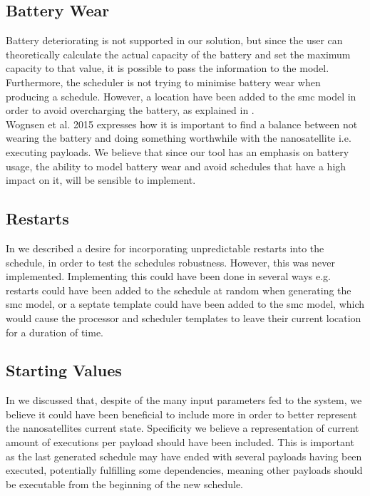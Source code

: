 \subsection*{Battery Wear}
Battery deteriorating is not supported in our solution, but since the user can theoretically calculate the actual capacity of the battery and set the maximum capacity to that value, it is possible to pass the information to the model. Furthermore, the scheduler is not trying to minimise battery wear when producing a schedule. However, a location have been added to the \gls{smc} model in order to avoid overcharging the battery, as explained in .\\
Wognsen et al. 2015\cite{score_function} expresses how it is important to find a balance between not wearing the battery and doing something worthwhile with the nanosatellite i.e. executing payloads. We believe that since our tool has an emphasis on battery usage, the ability to model battery wear and avoid schedules that have a high impact on it, will be sensible to implement. 

\subsection*{Restarts}
In  we described a desire for incorporating unpredictable restarts into the schedule, in order to test the schedules robustness. However, this was never implemented. Implementing this could have been done in several ways e.g. restarts could have been added to the schedule at random when generating the \gls{smc} model, or a septate template could have been added to the \gls{smc} model, which would cause the processor and scheduler templates to leave their current location for a duration of time.

\subsection*{Starting Values} \label{ssec:start_val}
In  we discussed that, despite of the many input parameters fed to the system, we believe it could have been beneficial to include more in order to better represent the nanosatellites current state. Specificity we believe a representation of current amount of executions per payload should have been included. This is important as the last generated schedule may have ended with several payloads having been executed, potentially fulfilling some dependencies, meaning other payloads should be executable from the beginning of the new schedule.

